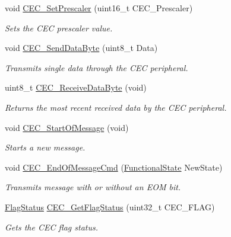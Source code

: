 \begin{DoxyCompactItemize}
void \hyperlink{group___c_e_c___exported___functions_gad2fc626e28a82008a29f062975a9af11}{C\+E\+C\+\_\+\+Set\+Prescaler} (uint16\+\_\+t C\+E\+C\+\_\+\+Prescaler)
\begin{DoxyCompactList}\small\item\em Sets the C\+EC prescaler value. \end{DoxyCompactList}\item 
void \hyperlink{group___c_e_c___exported___functions_ga6897ab26d8f909f9160e9fac54b97441}{C\+E\+C\+\_\+\+Send\+Data\+Byte} (uint8\+\_\+t Data)
\begin{DoxyCompactList}\small\item\em Transmits single data through the C\+EC peripheral. \end{DoxyCompactList}\item 
uint8\+\_\+t \hyperlink{group___c_e_c___exported___functions_ga165837bff6292e7674eff6f8b230da97}{C\+E\+C\+\_\+\+Receive\+Data\+Byte} (void)
\begin{DoxyCompactList}\small\item\em Returns the most recent received data by the C\+EC peripheral. \end{DoxyCompactList}\item 
void \hyperlink{group___c_e_c___exported___functions_ga71e700461ffe7820d9e1c75da65fd0fb}{C\+E\+C\+\_\+\+Start\+Of\+Message} (void)
\begin{DoxyCompactList}\small\item\em Starts a new message. \end{DoxyCompactList}\item 
void \hyperlink{group___c_e_c___exported___functions_ga1e2cf6e3a1ac891f2814f9d3f4043574}{C\+E\+C\+\_\+\+End\+Of\+Message\+Cmd} (\hyperlink{group___exported__types_gac9a7e9a35d2513ec15c3b537aaa4fba1}{Functional\+State} New\+State)
\begin{DoxyCompactList}\small\item\em Transmits message with or without an E\+OM bit. \end{DoxyCompactList}\item 
\hyperlink{group___exported__types_ga89136caac2e14c55151f527ac02daaff}{Flag\+Status} \hyperlink{group___c_e_c___exported___functions_gaf920706cb350182bf0728c66868053ca}{C\+E\+C\+\_\+\+Get\+Flag\+Status} (uint32\+\_\+t C\+E\+C\+\_\+\+F\+L\+AG)
\begin{DoxyCompactList}\small\item\em Gets the C\+EC flag status. \end{DoxyCompactList}\item 

\end{DoxyCompactItemize}
